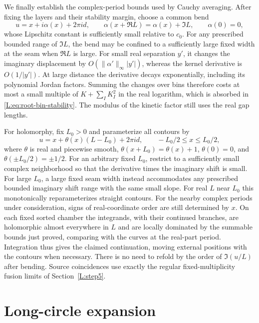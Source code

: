 \documentclass[11pt]{article}
\numberwithin{equation}{section}
\theoremstyle{definition}\newtheorem{definition}[theorem]{Definition}
\theoremstyle{remark}\newtheorem{remark}[theorem]{Remark}
\begin{document}
We finally establish the complex-period bounds used by Cauchy averaging.
After fixing the layers and their stability margin, choose a common bend
\[
 u=x+i\alpha(x)+2\pi i d,\qquad
 \alpha(x+\Re L)=\alpha(x)+\Im L,\qquad\alpha(0)=0,
\]
whose Lipschitz constant is sufficiently small relative to $c_0$.
For any prescribed bounded range of $\Im L$, the bend may be confined
to a sufficiently large fixed width at the seam when $\Re L$ is large.
For small real separation $y'$, it changes the imaginary displacement
by $O(\|\alpha'\|_\infty|y'|)$, whereas the kernel derivative is
$O(1/|y'|)$. At large distance the derivative decays exponentially,
including its polynomial Jordan factors. Summing the changes over bins
therefore costs at most a small multiple of $K+\sum_IK_I^2$ in the real
logarithm, which is absorbed in \eqref{L:eq:root-bin-stability}.
The modulus of the kinetic factor still uses the real gap lengths.

For holomorphy, fix $L_0>0$ and parameterize all contours by
\[
 u=x+\theta(x)(L-L_0)+2\pi i d,
 \qquad -L_0/2\le x\le L_0/2,
\]
where $\theta$ is real and piecewise smooth,
$\theta(x+L_0)=\theta(x)+1$, $\theta(0)=0$, and
$\theta(\pm L_0/2)=\pm1/2$. For an arbitrary fixed $L_0$, restrict to a sufficiently small complex
neighborhood so that the derivative times the imaginary shift is small.
For large $L_0$, a large fixed seam width instead accommodates any
prescribed bounded imaginary shift range with the same small slope.
For real $L$ near $L_0$ this monotonically reparameterizes straight
contours. For the nearby complex periods under consideration, signs of
real-coordinate order are still determined by $x$. On each fixed sorted
chamber the integrands, with their continued branches, are holomorphic
almost everywhere in $L$ and are locally dominated by the summable
bounds just proved, comparing with the curves at the real-part period.
Integration thus gives the claimed continuation, moving external
positions with the contours when necessary. There is no need to refold
by the order of $\Im(u/L)$ after bending. Source coincidences use exactly
the regular fixed-multiplicity fusion limits of Section~\ref{L:step5}.

\section{Long-circle expansion}\label{L:part3}
\end{document}
